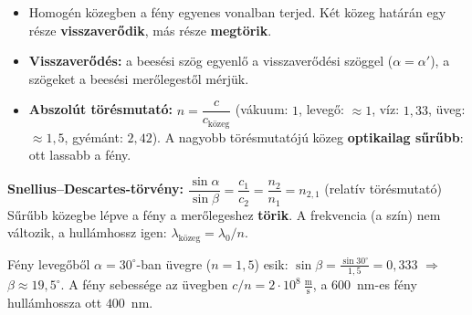 \documentclass[12pt]{article}
\begin{document}
\begin{minipage}[t]{0.58\linewidth}\vspace{0pt}
\begin{itemize}
  \item Homogén közegben a fény egyenes vonalban terjed. Két közeg határán egy része
    \textbf{visszaverődik}, más része \textbf{megtörik}.
  \item \textbf{Visszaverődés:} a beesési szög egyenlő a visszaverődési szöggel
    ($\alpha = \alpha'$), a szögeket a beesési merőlegestől mérjük.
  \item \textbf{Abszolút törésmutató:} $n = \dfrac{c}{c_\text{közeg}}$ \;
    (vákuum: $1$, levegő: $\approx 1$, víz: $1{,}33$, üveg: $\approx 1{,}5$, gyémánt: $2{,}42$).
    A nagyobb törésmutatójú közeg \textbf{optikailag sűrűbb}: ott lassabb a fény.
\end{itemize}
\begin{fontos}
\centering \textbf{Snellius--Descartes-törvény:} \quad
$\dfrac{\sin\alpha}{\sin\beta} = \dfrac{c_1}{c_2} = \dfrac{n_2}{n_1} = n_{2,1}$
\quad (relatív törésmutató)\\[3pt]
Sűrűbb közegbe lépve a fény a merőlegeshez \textbf{törik}. A frekvencia (a szín) nem
változik, a hullámhossz igen: $\lambda_\text{közeg} = \lambda_0 / n$.
\end{fontos}
\begin{pelda}
Fény levegőből $\alpha = 30^\circ$-ban üvegre ($n = 1{,}5$) esik:
$\sin\beta = \tfrac{\sin 30^\circ}{1{,}5} = 0{,}333$ $\Rightarrow$ $\beta \approx 19{,}5^\circ$.
A fény sebessége az üvegben $c/n = 2\cdot 10^8~\tfrac{\text{m}}{\text{s}}$, a $600$~nm-es
fény hullámhossza ott $400$~nm.
\end{pelda}
\end{minipage}\hfill
\begin{minipage}[t]{0.38\linewidth}\vspace{0pt}\centering
{}
\end{minipage}
\end{document}
